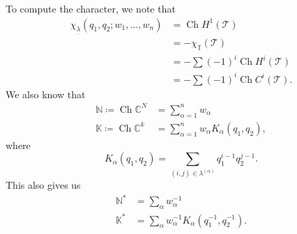 \documentclass[leqno, openany]{memoir}
\theoremstyle{definition}
\theoremstyle{remark}
\theoremstyle{plain}
\theoremstyle{definition}
\theoremstyle{remark}
\newcommand{\N}{\mathbb{N}}
\newcommand{\C}{\mathbb{C}}
\newcommand{\mc}[1]{\mathcal{#1}}
\newcommand{\T}{\mathbb{T}}
\newcommand{\on}[1]{\operatorname{#1}}
\newcommand{\ul}[1]{\underline{#1}}
\begin{document}
To compute the character, we note that
\begin{align*}
    \chi_{\ul{\lambda}}(q_1, q_2; w_1, \ldots, w_n) &= \on{Ch} H^1(\mc{T}) \\
    &= - \chi_{\T}(\mc{T}) \\
    &= - \sum (-1)^i \on{Ch} H^i(\mc{T}) \\
    &= - \sum (-1)^i \on{Ch} C^i(\mc{T}).
\end{align*}
We also know that
\begin{align*}
    \N \coloneqq \on{Ch} \C^N &= \sum_{\alpha = 1}^n w_{\alpha} \\
    \mathbb{K} \coloneqq \on{Ch} \C^k &= \sum_{\alpha=1}^n w_{\alpha} K_{\alpha}(q_1, q_2),
\end{align*}
where
\[ K_{\alpha}(q_1, q_2) = \sum_{(i,j) \in \lambda^{(\alpha)}} q_1^{i-1} q_2^{j-1}. \]
This also gives us
\begin{align*}
    \N^* &= \sum_{\alpha} w_{\alpha}^{-1} \\
    \mathbb{K}^* &= \sum_{\alpha} w_{\alpha}^{-1} K_{\alpha}(q_1^{-1}, q_2^{-1}).
\end{align*}
\end{document}
